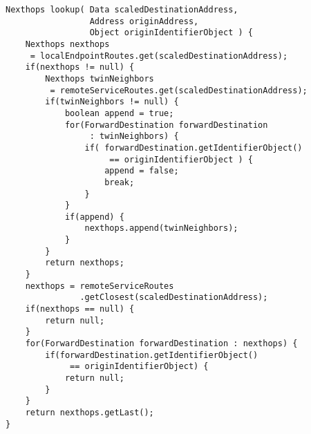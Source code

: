 \javalisting
\begin{minipage}{\linewidth}
\begin{lstlisting}[caption={Routing im \gls*{cnt} (Java)},captionpos=b]
Nexthops lookup( Data scaledDestinationAddress,
				 Address originAddress,
				 Object originIdentifierObject ) {
	Nexthops nexthops
	 = localEndpointRoutes.get(scaledDestinationAddress);
	if(nexthops != null) {
		Nexthops twinNeighbors
		 = remoteServiceRoutes.get(scaledDestinationAddress);
		if(twinNeighbors != null) {
			boolean append = true;
			for(ForwardDestination forwardDestination
				 : twinNeighbors) {
				if( forwardDestination.getIdentifierObject()
					 == originIdentifierObject ) {
					append = false;
					break;
				}
			}
			if(append) {
				nexthops.append(twinNeighbors);
			}
		}
		return nexthops;
	}
	nexthops = remoteServiceRoutes
			   .getClosest(scaledDestinationAddress);
	if(nexthops == null) {
		return null;
	}
	for(ForwardDestination forwardDestination : nexthops) {
		if(forwardDestination.getIdentifierObject()
			 == originIdentifierObject) {
			return null;
		}
	}
	return nexthops.getLast();
}
\end{lstlisting}
\end{minipage}

